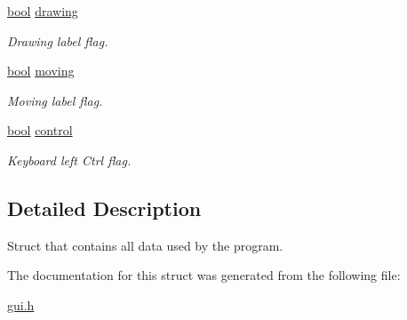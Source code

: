 \begin{DoxyCompactItemize}
\mbox{\label{structdata_a34d9303c5297c2d4bdfe55ec497d0876}} 
\hyperlink{Label_8h_af6a258d8f3ee5206d682d799316314b1}{bool} \hyperlink{structdata_a34d9303c5297c2d4bdfe55ec497d0876}{drawing}
\begin{DoxyCompactList}\small\item\em Drawing label flag. \end{DoxyCompactList}\item 
\mbox{\label{structdata_a0c934b7b308d20fd25833cdf19adece8}} 
\hyperlink{Label_8h_af6a258d8f3ee5206d682d799316314b1}{bool} \hyperlink{structdata_a0c934b7b308d20fd25833cdf19adece8}{moving}
\begin{DoxyCompactList}\small\item\em Moving label flag. \end{DoxyCompactList}\item 
\mbox{\label{structdata_ab7620c88532918effb4eea21a82d6eb5}} 
\hyperlink{Label_8h_af6a258d8f3ee5206d682d799316314b1}{bool} \hyperlink{structdata_ab7620c88532918effb4eea21a82d6eb5}{control}
\begin{DoxyCompactList}\small\item\em Keyboard left Ctrl flag. \end{DoxyCompactList}\end{DoxyCompactItemize}


\subsection{Detailed Description}
Struct that contains all data used by the program. 

The documentation for this struct was generated from the following file\+:\begin{DoxyCompactItemize}
\item 
\hyperlink{gui_8h}{gui.\+h}\end{DoxyCompactItemize}
